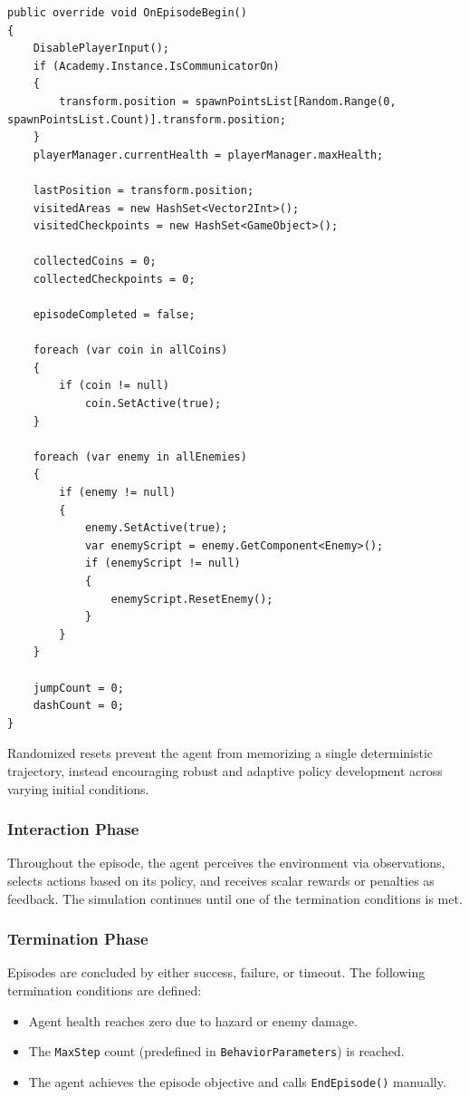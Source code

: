 \documentclass[12pt,oneside,openright,a4paper]{cpe-english-project}
\begin{document}
\begin{lstlisting}[language={[Sharp]C}]
public override void OnEpisodeBegin()
{
	DisablePlayerInput();
	if (Academy.Instance.IsCommunicatorOn)
	{
		transform.position = spawnPointsList[Random.Range(0, spawnPointsList.Count)].transform.position;
	}
	playerManager.currentHealth = playerManager.maxHealth;

	lastPosition = transform.position;
	visitedAreas = new HashSet<Vector2Int>();
	visitedCheckpoints = new HashSet<GameObject>();
	
	collectedCoins = 0;
	collectedCheckpoints = 0;
	
	episodeCompleted = false;
	
	foreach (var coin in allCoins)
	{
		if (coin != null)
			coin.SetActive(true);
	}
	
	foreach (var enemy in allEnemies)
	{
		if (enemy != null)
		{
			enemy.SetActive(true);
			var enemyScript = enemy.GetComponent<Enemy>();
			if (enemyScript != null)
			{
				enemyScript.ResetEnemy();
			}
		}
	}
	
	jumpCount = 0;
	dashCount = 0;
}
\end{lstlisting}

Randomized resets prevent the agent from memorizing a single deterministic trajectory, instead encouraging robust and adaptive policy development across varying initial conditions.

\subsubsection{Interaction Phase}

Throughout the episode, the agent perceives the environment via observations, selects actions based on its policy, and receives scalar rewards or penalties as feedback. The simulation continues until one of the termination conditions is met.

\subsubsection{Termination Phase}

Episodes are concluded by either success, failure, or timeout. The following termination conditions are defined:

\begin{itemize}
\item Agent health reaches zero due to hazard or enemy damage.
\item The \texttt{MaxStep} count (predefined in \texttt{BehaviorParameters}) is reached.
\item The agent achieves the episode objective and calls \texttt{EndEpisode()} manually.
\end{itemize}
\end{document}
